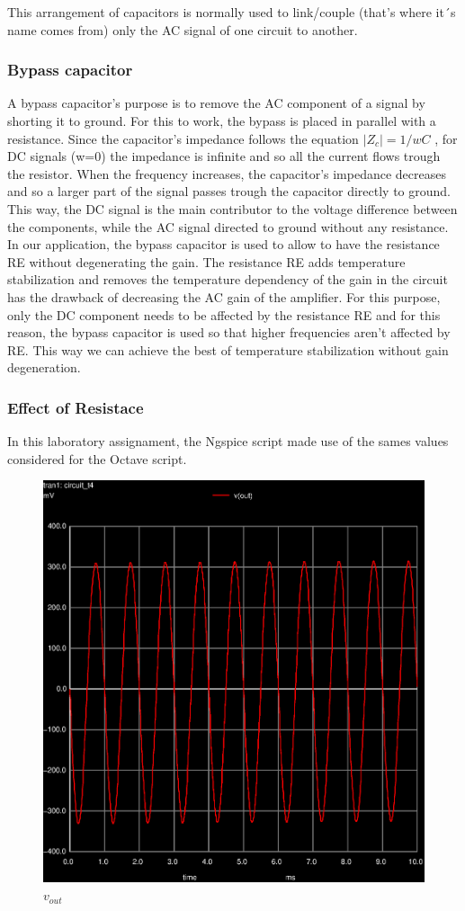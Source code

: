 This arrangement of capacitors is normally used to link/couple (that’s where it´s name comes from) only the AC signal of one circuit to another.

\subsubsection{Bypass capacitor}

A bypass capacitor’s purpose is to remove the AC component of a signal by shorting it to ground.
For this to work, the bypass is placed in parallel with a resistance. Since the capacitor’s impedance follows the equation $|Z_c|=1/wC$ , for DC signals (w=0) the impedance is infinite and so all the current flows trough the resistor. When the frequency increases, the capacitor’s impedance decreases and so a larger part of the signal passes trough the capacitor directly to ground. This way, the DC signal is the main contributor to the voltage difference between the components, while the AC signal directed to ground without any resistance.
In our application, the bypass capacitor is used to allow to have the resistance RE without degenerating the gain. The resistance RE adds temperature stabilization and removes the temperature dependency of the gain in the circuit has the drawback of decreasing the AC gain of the amplifier. For this purpose, only the DC component needs to be affected by the resistance RE and for this reason, the bypass capacitor is used so that higher frequencies aren’t affected by RE. This way we can achieve the best of temperature stabilization without gain degeneration.

\subsubsection{Effect of Resistace }


In this laboratory assignament, the Ngspice script made use of the sames values considered for
the Octave script.


\begin{figure}[ht]
	\centering
	\includegraphics[width=0.6\linewidth]{vo1.eps}
	\caption{$v_{out}$}
\label{fig:graph_global}
\end{figure}

